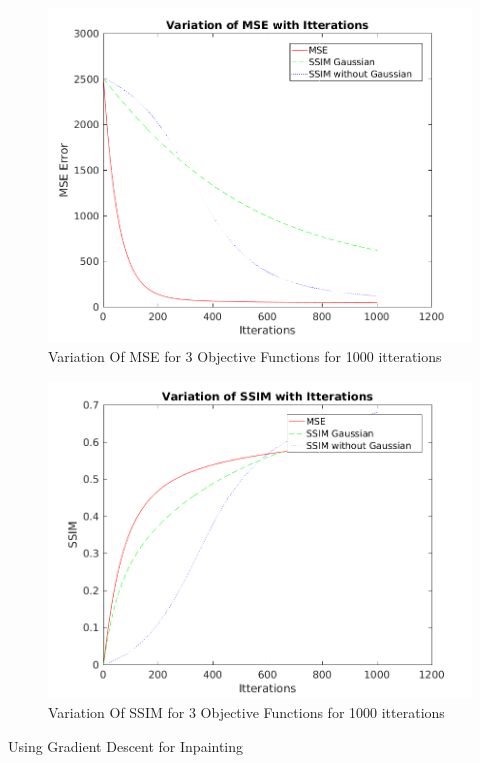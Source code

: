 \documentclass[a4paper, 15pt]{article}
\begin{document}
	\newpage	
	\begin{figure}[h]
		\centering
		\includegraphics[scale=0.6]{Variation_of_MSE_with_Itterations.png}
		\caption{Variation Of MSE for 3 Objective Functions for 1000 itterations}
		\label{fig:Variation_of_MSE_with_Itterations}
	\end{figure}
	\begin{figure}[h]
		\centering
		\includegraphics[scale=0.6]{Variation_of_SSIM_with_Itterations.png}
		\caption{Variation Of SSIM for 3 Objective Functions for 1000 itterations}
		\label{fig:Variation_of_SSIM_with_Itterations}
	\end{figure}
	\newpage
	\begin{center}
		{\fontsize{20}{30}\selectfont Using Gradient Descent for Inpainting}\
	\end{center}
\end{document}
